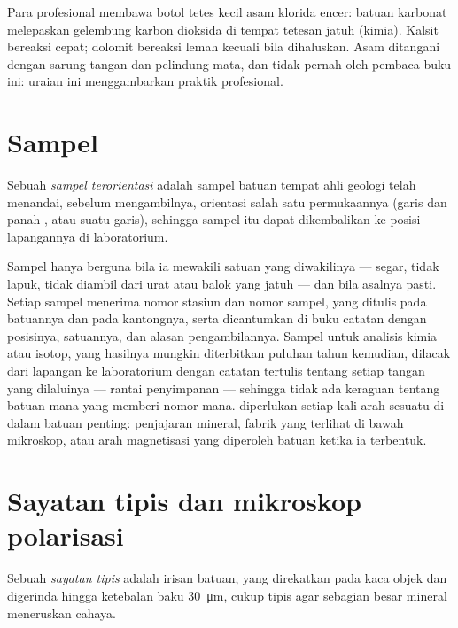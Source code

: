 Para profesional membawa botol tetes kecil asam klorida encer: batuan karbonat melepaskan gelembung karbon dioksida di tempat tetesan jatuh (kimia). Kalsit bereaksi cepat; dolomit bereaksi lemah kecuali bila dihaluskan. Asam ditangani dengan sarung tangan dan pelindung mata, dan tidak pernah oleh pembaca buku ini: uraian ini menggambarkan praktik profesional.

\section{Sampel}

\begin{definition}\label{def:b1:field-lab-methods-1:sample}
Sebuah \emph{sampel terorientasi} adalah sampel batuan tempat ahli geologi telah menandai, sebelum mengambilnya, orientasi salah satu permukaannya (garis  dan panah , atau  suatu garis), sehingga sampel itu dapat dikembalikan ke posisi lapangannya di laboratorium.
\end{definition}

Sampel hanya berguna bila ia mewakili satuan yang diwakilinya --- segar, tidak lapuk, tidak diambil dari urat atau balok yang jatuh --- dan bila asalnya pasti. Setiap sampel menerima nomor stasiun dan nomor sampel, yang ditulis pada batuannya dan pada kantongnya, serta dicantumkan di buku catatan dengan posisinya, satuannya, dan alasan pengambilannya. Sampel untuk analisis kimia atau isotop, yang hasilnya mungkin diterbitkan puluhan tahun kemudian, dilacak dari lapangan ke laboratorium dengan catatan tertulis tentang setiap tangan yang dilaluinya --- rantai penyimpanan --- sehingga tidak ada keraguan tentang batuan mana yang memberi nomor mana.  diperlukan setiap kali arah sesuatu di dalam batuan penting: penjajaran mineral, fabrik yang terlihat di bawah mikroskop, atau arah magnetisasi yang diperoleh batuan ketika ia terbentuk.

\section{Sayatan tipis dan mikroskop polarisasi}

\begin{definition}\label{def:b1:field-lab-methods-1:thin-section}
Sebuah \emph{sayatan tipis} adalah irisan batuan, yang direkatkan pada kaca objek dan digerinda hingga ketebalan baku \qty{30}{\micro\metre}, cukup tipis agar sebagian besar mineral meneruskan cahaya.
\end{definition}

